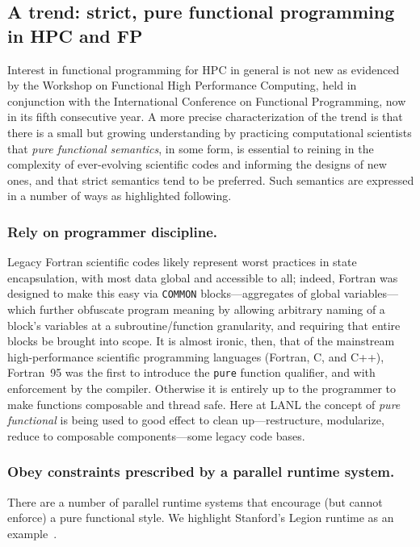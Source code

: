 \documentclass{llncs}
\begin{document}
\subsection{A trend: strict, pure functional programming in HPC and FP}
Interest in functional programming for HPC in general is not new as evidenced
by the Workshop on Functional High Performance Computing, held in conjunction
with the International Conference on Functional Programming, now in its fifth
consecutive year.  A more precise characterization of the trend is that there
is a small but growing understanding by practicing computational scientists
that \emph{pure functional semantics}, in some form, is essential to reining
in the complexity of ever-evolving scientific codes and informing the designs
of new ones, and that strict semantics tend to be preferred.  Such semantics
are expressed in a number of ways as highlighted following.

\subsubsection{Rely on programmer discipline.}
Legacy Fortran scientific codes likely represent worst practices in state
encapsulation, with most data global and accessible to all; indeed, Fortran
was designed to make this easy via \texttt{COMMON} blocks---aggregates of
global variables---which further obfuscate program meaning by allowing
arbitrary naming of a block's variables at a subroutine/function granularity,
and requiring that entire blocks be brought into scope.  It is almost ironic,
then, that of the mainstream high-performance scientific programming languages
(Fortran, C, and C++), Fortran~95 was the first to introduce the \texttt{pure}
function qualifier, and with enforcement by the compiler.  Otherwise it is
entirely up to the programmer to make functions composable and thread safe.
Here at LANL the concept of \emph{pure functional} is being used to good
effect to clean up---restructure, modularize, reduce to composable
components---some legacy code bases.

\subsubsection{Obey constraints prescribed by a parallel runtime system.}
There are a number of parallel runtime systems that encourage (but cannot
enforce) a pure functional style.  We highlight Stanford's Legion
runtime as an example~\cite{Bauer12}.
\end{document}

